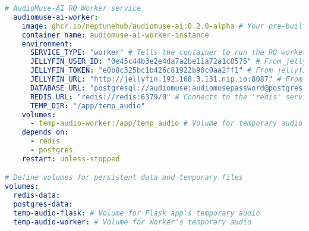 \documentclass{article}
\begin{document}
\begin{enumerate}
\begin{lstlisting}[language=yaml, caption=docker-compose.yaml]
  # AudioMuse-AI RQ Worker service
  audiomuse-ai-worker:
    image: ghcr.io/neptunehub/audiomuse-ai:0.2.0-alpha # Your pre-built image
    container_name: audiomuse-ai-worker-instance
    environment:
      SERVICE_TYPE: "worker" # Tells the container to run the RQ worker
      JELLYFIN_USER_ID: "0e45c44b3e2e4da7a2be11a72a1c8575" # From jellyfin-credentials secret
      JELLYFIN_TOKEN: "e0b8c325bc1b426c81922b90c0aa2ff1" # From jellyfin-credentials secret
      JELLYFIN_URL: "http://jellyfin.192.168.3.131.nip.io:8087" # From audiomuse-ai-config ConfigMap
      DATABASE_URL: "postgresql://audiomuse:audiomusepassword@postgres:5432/audiomusedb" # Connects to the 'postgres' service
      REDIS_URL: "redis://redis:6379/0" # Connects to the 'redis' service
      TEMP_DIR: "/app/temp_audio"
    volumes:
      - temp-audio-worker:/app/temp_audio # Volume for temporary audio files
    depends_on:
      - redis
      - postgres
    restart: unless-stopped

# Define volumes for persistent data and temporary files
volumes:
  redis-data:
  postgres-data:
  temp-audio-flask: # Volume for Flask app's temporary audio
  temp-audio-worker: # Volume for Worker's temporary audio
    \end{lstlisting}


\end{enumerate}
\end{document}
